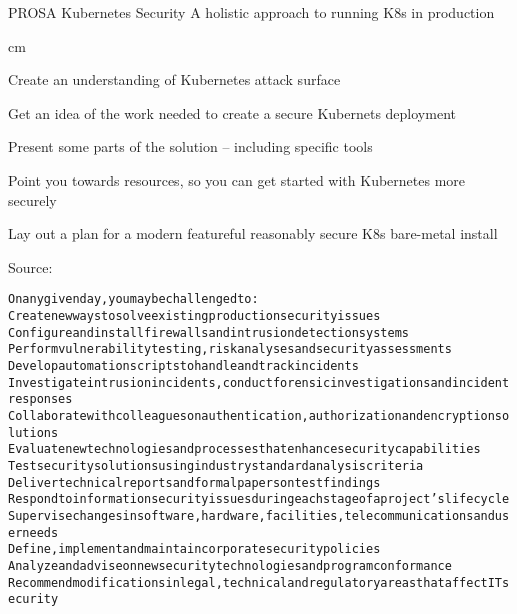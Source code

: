 \documentclass[Screen16to9,17pt]{foils}
\begin{document}
{}

\mytitlepage
{PROSA Kubernetes Security}
{A holistic approach to running K8s in production}
\LogoOn

 cm


\begin{list2}
\item Create an understanding of Kubernetes attack surface
\item Get an idea of the work needed to create a secure Kubernets deployment
\item Present some parts of the solution -- including specific tools \faWrench
\item Point you towards resources, so you can get started with Kubernetes more securely
\item Lay out a plan for a modern featureful reasonably secure K8s bare-metal install
\end{list2}



Source: 


\begin{alltt}\small
On any given day, you may be challenged to:
        Create new ways to solve existing production security issues
        Configure and install firewalls and intrusion detection systems
        Perform vulnerability testing, risk analyses and security assessments
        Develop automation scripts to handle and track incidents
        Investigate intrusion incidents, conduct forensic investigations and incident responses
        Collaborate with colleagues on authentication, authorization and encryption solutions
        Evaluate new technologies and processes that enhance security capabilities
        Test security solutions using industry standard analysis criteria
        Deliver technical reports and formal papers on test findings
        Respond to information security issues during each stage of a project’s lifecycle
        Supervise changes in software, hardware, facilities, telecommunications and user needs
        Define, implement and maintain corporate security policies
        Analyze and advise on new security technologies and program conformance
        Recommend modifications in legal, technical and regulatory areas that affect IT security
\end{alltt}
\end{document}
